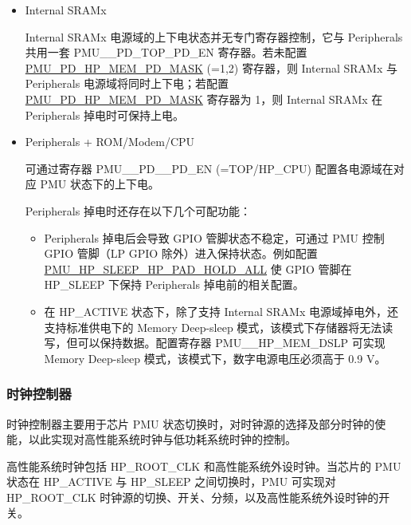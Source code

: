\documentclass[main\_\_CN.tex]{subfiles}
\begin{document}
\begin{itemize}
\item Internal SRAMx

    Internal SRAMx 电源域的上下电状态并无专门寄存器控制，它与 Peripherals 共用一套 PMU\_\_PD\_TOP\_PD\_EN 寄存器。若未配置 \hyperref[fielddesc:PMUPDHPMEM1PDMASK]{PMU\_PD\_HP\_MEM\_PD\_MASK} (=1,2) 寄存器，则 Internal SRAMx 与 Peripherals 电源域将同时上下电；若配置 \hyperref[fielddesc:PMUPDHPMEM1PDMASK]{PMU\_PD\_HP\_MEM\_PD\_MASK} 寄存器为 1，则 Internal SRAMx 在 Peripherals 掉电时可保持上电。

\item Peripherals + ROM/Modem/CPU

    可通过寄存器 PMU\_\_PD\_\_PD\_EN (=TOP/HP\_CPU) 配置各电源域在对应 PMU 状态下的上下电。

    Peripherals 掉电时还存在以下几个可配功能：
        \begin{itemize}
        \item Peripherals 掉电后会导致 GPIO 管脚状态不稳定，可通过 PMU 控制 GPIO 管脚（LP GPIO 除外）进入保持状态。例如配置 \hyperref[fielddesc:PMUHPSLEEPHPPADHOLDALL]{PMU\_HP\_SLEEP\_HP\_PAD\_HOLD\_ALL} 使 GPIO 管脚在 HP\_SLEEP 下保持 Peripherals 掉电前的相关配置。

        \item 在 HP\_ACTIVE 状态下，除了支持 Internal SRAMx 电源域掉电外，还支持标准供电下的 Memory Deep-sleep 模式，该模式下存储器将无法读写，但可以保持数据。配置寄存器 PMU\_\_HP\_MEM\_DSLP 可实现 Memory Deep-sleep 模式，该模式下，数字电源电压必须高于 0.9 V。
        \end{itemize}
\end{itemize}

\subsubsection{时钟控制器}

时钟控制器主要用于芯片 PMU 状态切换时，对时钟源的选择及部分时钟的使能，以此实现对高性能系统时钟与低功耗系统时钟的控制。

高性能系统时钟包括 HP\_ROOT\_CLK 和高性能系统外设时钟。当芯片的 PMU 状态在 HP\_ACTIVE 与 HP\_SLEEP 之间切换时，PMU 可实现对 HP\_ROOT\_CLK 时钟源的切换、开关、分频，以及高性能系统外设时钟的开关。
\end{document}

